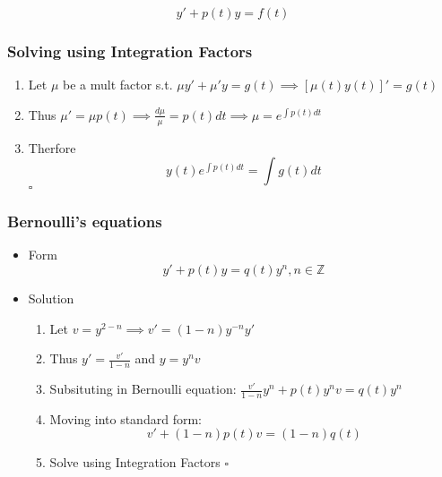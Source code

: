 \documentclass[11pt]{article}
\begin{document}
    \begin{equation}
    y' + p(t)y = f(t)
    \end{equation}
\subsubsection{Solving using Integration Factors}
\label{sec-9-1-2}

\begin{enumerate}
\item Let $\mu$ be a mult factor s.t. $\mu y' + \mu'y=g(t) \implies [\mu(t) y(t)]'= g(t)$
\item Thus $\mu'=\mu p(t) \implies \frac{d\mu}{\mu}=p(t)dt \implies
       \mu = e^{\int p(t)dt }$
\item Therfore
       \begin{equation}
       y(t)e^{\int p(t)dt}=\int g(t)dt
       \end{equation} $\square$
\end{enumerate}
\subsubsection{Bernoulli's equations}
\label{sec-9-1-3}
\begin{itemize}

\item Form\\
\label{sec-9-1-3-1}%
\begin{equation}
     y'+p(t)y=q(t)y^n, n\in \mathbb{Z}
     \end{equation}

\item Solution
\label{sec-9-1-3-2}%
\begin{enumerate}
\item Let $v=y^{2-n} \implies v'=(1-n)y^{-n}y'$
\item Thus $y'=\frac{v'}{1-n}$ and $y = y^n v$
\item Subsituting in Bernoulli equation: $\frac{v'}{1-n}y^n+p(t)y^nv=q(t)y^n$
\item Moving into standard form:
        \begin{equation}
        v'+(1-n)p(t)v=(1-n)q(t)
        \end{equation}
\item Solve using Integration Factors $\square$
\end{enumerate}
\end{itemize} %
\end{document}
